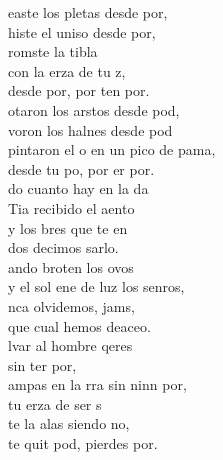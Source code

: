 \documentclass[12pt]{article}
\begin{document}
\begin{multicols*}{2}
\begin{cancion}%
	easte los pletas desde  por,\\
	histe el uniso desde  por,\\
	romste la tibla \\
	con la erza de tu z,\\
	desde  por, por ten por.\\
	otaron los arstos desde  pod,\\
	voron los halnes desde pod\\
	pintaron el o en un pico de pama,\\
	desde tu po, por er por.\\
	do cuanto hay en la da\\
	Tia recibido el aento\\
	y los bres que te en\\
	dos decimos sarlo.  \\
	ando broten los ovos\\
	y el sol ene de luz los senros,\\
	nca olvidemos, jams,\\
	que cual  hemos deaceo.\\
	lvar al hombre qeres \\
	sin ter por,\\
	ampas en la rra sin ninn por, \\
	tu erza de ser s\\
	te la alas siendo no, \\
	te quit pod, pierdes  por.\\

\end{cancion}
\end{multicols*}
\end{document}
